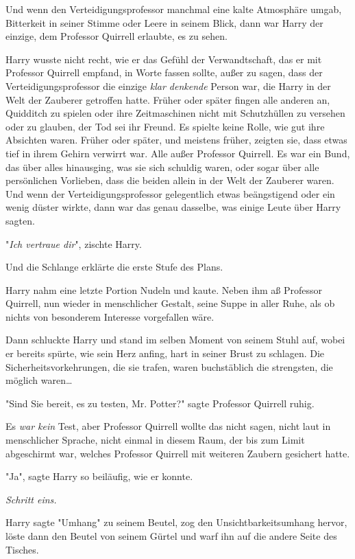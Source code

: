 {Und wenn den Verteidigungsprofessor manchmal eine kalte Atmosphäre umgab, Bitterkeit in seiner Stimme oder Leere in seinem Blick, dann war Harry der einzige, dem Professor Quirrell erlaubte, es zu sehen.

Harry wusste nicht recht, wie er das Gefühl der Verwandtschaft, das er mit Professor Quirrell empfand, in Worte fassen sollte, außer zu sagen, dass der Verteidigungsprofessor die einzige \emph{klar denkende} Person war, die Harry in der Welt der Zauberer getroffen hatte. Früher oder später fingen alle anderen an, Quidditch zu spielen oder ihre Zeitmaschinen nicht mit Schutzhüllen zu versehen oder zu glauben, der Tod sei ihr Freund. Es spielte keine Rolle, wie gut ihre Absichten waren. Früher oder später, und meistens früher, zeigten sie, dass etwas tief in ihrem Gehirn verwirrt war. Alle außer Professor Quirrell. Es war ein Bund, das über alles hinausging, was sie sich schuldig waren, oder sogar über alle persönlichen Vorlieben, dass die beiden allein in der Welt der Zauberer waren. Und wenn der Verteidigungsprofessor gelegentlich etwas beängstigend oder ein wenig düster wirkte, dann war das genau dasselbe, was einige Leute über Harry sagten.

"\emph{Ich vertraue dir}", zischte Harry.

Und die Schlange erklärte die erste Stufe des Plans.

Harry nahm eine letzte Portion Nudeln und kaute. Neben ihm aß Professor Quirrell, nun wieder in menschlicher Gestalt, seine Suppe in aller Ruhe, als ob nichts von besonderem Interesse vorgefallen wäre.

Dann schluckte Harry und stand im selben Moment von seinem Stuhl auf, wobei er bereits spürte, wie sein Herz anfing, hart in seiner Brust zu schlagen. Die Sicherheitsvorkehrungen, die sie trafen, waren buchstäblich die strengsten, die möglich waren…

"Sind Sie bereit, es zu testen, Mr. Potter?" sagte Professor Quirrell ruhig.

Es \emph{war kein} Test, aber Professor Quirrell wollte das nicht sagen, nicht laut in menschlicher Sprache, nicht einmal in diesem Raum, der bis zum Limit abgeschirmt war, welches Professor Quirrell mit weiteren Zaubern gesichert hatte.

"Ja", sagte Harry so beiläufig, wie er konnte.

\emph{Schritt eins.}

Harry sagte "Umhang" zu seinem Beutel, zog den Unsichtbarkeitsumhang hervor, löste dann den Beutel von seinem Gürtel und warf ihn auf die andere Seite des Tisches.

}
